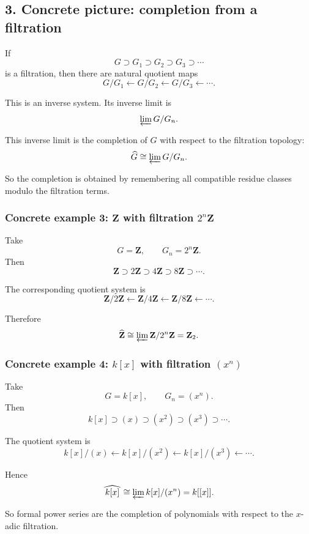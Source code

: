 \documentclass[12pt,a4paper]{article}
\theoremstyle{plain}
\theoremstyle{definition}      %
\begin{document}
	\subsection*{3. Concrete picture: completion from a filtration}
	
	If
	\[
	G \supset G_1 \supset G_2 \supset G_3 \supset \cdots
	\]
	is a filtration, then there are natural quotient maps
	\[
	G/G_1 \xleftarrow{} G/G_2 \xleftarrow{} G/G_3 \xleftarrow{}\cdots.
	\]
	
	This is an inverse system. Its inverse limit is
	\[
	\varprojlim G/G_n.
	\]
	
	This inverse limit is the completion of \(G\) with respect to the filtration topology:
	\[
	\widehat G \cong \varprojlim G/G_n.
	\]
	
	So the completion is obtained by remembering all compatible residue classes modulo the filtration terms.
	
	\subsubsection*{Concrete example 3: \(\mathbf Z\) with filtration \(2^n\mathbf Z\)}
	
	Take
	\[
	G=\mathbf Z,
	\qquad
	G_n=2^n\mathbf Z.
	\]
	Then
	\[
	\mathbf Z \supset 2\mathbf Z \supset 4\mathbf Z \supset 8\mathbf Z \supset \cdots.
	\]
	
	The corresponding quotient system is
	\[
	\mathbf Z/2\mathbf Z
	\xleftarrow{}
	\mathbf Z/4\mathbf Z
	\xleftarrow{}
	\mathbf Z/8\mathbf Z
	\xleftarrow{}\cdots.
	\]
	
	Therefore
	\[
	\widehat{\mathbf Z} \cong \varprojlim \mathbf Z/2^n\mathbf Z = \mathbf Z_2.
	\]
	
	\subsubsection*{Concrete example 4: \(k[x]\) with filtration \((x^n)\)}
	
	Take
	\[
	G=k[x],
	\qquad
	G_n=(x^n).
	\]
	Then
	\[
	k[x] \supset (x) \supset (x^2) \supset (x^3) \supset \cdots.
	\]
	
	The quotient system is
	\[
	k[x]/(x)
	\xleftarrow{}
	k[x]/(x^2)
	\xleftarrow{}
	k[x]/(x^3)
	\xleftarrow{}\cdots.
	\]
	
	Hence
	\[
	\widehat{\,k[x]\,}\cong \varprojlim k[x]/(x^n)=k[[x]].
	\]
	
	So formal power series are the completion of polynomials with respect to the \(x\)-adic filtration.
	
\end{document}
